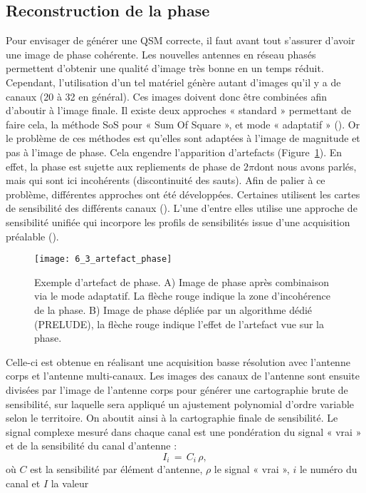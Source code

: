 {\subsection{Reconstruction de la phase}
\label{sec:reconstruction}
Pour envisager de générer une QSM correcte, il faut avant tout s’assurer d’avoir une image de
phase cohérente. Les nouvelles antennes en réseau phasés permettent d’obtenir une qualité d’image
très bonne en un temps réduit. Cependant, l’utilisation d’un tel matériel génère autant d’images qu’il
y a de canaux (20 à 32 en général). Ces images doivent donc être combinées afin d’aboutir à l’image
finale. Il existe deux approches « standard » permettant de faire cela, la méthode SoS pour « Sum Of
Square », et mode « adaptatif » (\cite{Walsh2000}). Or le problème de ces méthodes est qu’elles sont adaptées à
l’image de magnitude et pas à l’image de phase. Cela engendre l’apparition d’artefacts (Figure~\ref{fig:6_3_artefact_phase}). En
effet, la phase est sujette aux repliements de phase de $2\pi$dont nous avons parlés, mais qui sont ici
incohérents (discontinuité des sauts). Afin de palier à ce problème, différentes approches ont été
développées. Certaines utilisent les cartes de sensibilité des différents canaux (\cite{Robinson2011}). L’une d’entre elles
utilise une approche de sensibilité unifiée qui incorpore les profils de sensibilités issue d’une
acquisition préalable (\cite{Ros2009}).
\begin{figure}[!t]
\centering
\texttt{[image: 6\_3\_artefact\_phase]}
\caption{Exemple d'artefact de phase. A) Image de phase après combinaison via le mode adaptatif. La flèche rouge
indique la zone d'incohérence de la phase. B) Image de phase dépliée par un algorithme dédié (PRELUDE), la flèche
rouge indique l'effet de l'artefact vue sur la phase.}
\label{fig:6_3_artefact_phase}	
\end{figure}
Celle-ci est obtenue en réalisant une acquisition basse résolution avec l’antenne corps et l’antenne
multi-canaux. Les images des canaux de l’antenne sont ensuite divisées par l’image de l’antenne corps
pour générer une cartographie brute de sensibilité, sur laquelle sera appliqué un ajustement
polynomial d’ordre variable selon le territoire. On aboutit ainsi à la cartographie finale de sensibilité.
Le signal complexe mesuré dans chaque canal est une pondération du signal « vrai » et de la sensibilité
du canal d’antenne :
\begin{equation}
I_i \,=\,C_i\,\rho,
\end{equation}
où $C$ est la sensibilité par élément d’antenne, $\rho$ le signal « vrai », $i$ le numéro du canal et $I$ la valeur
}

